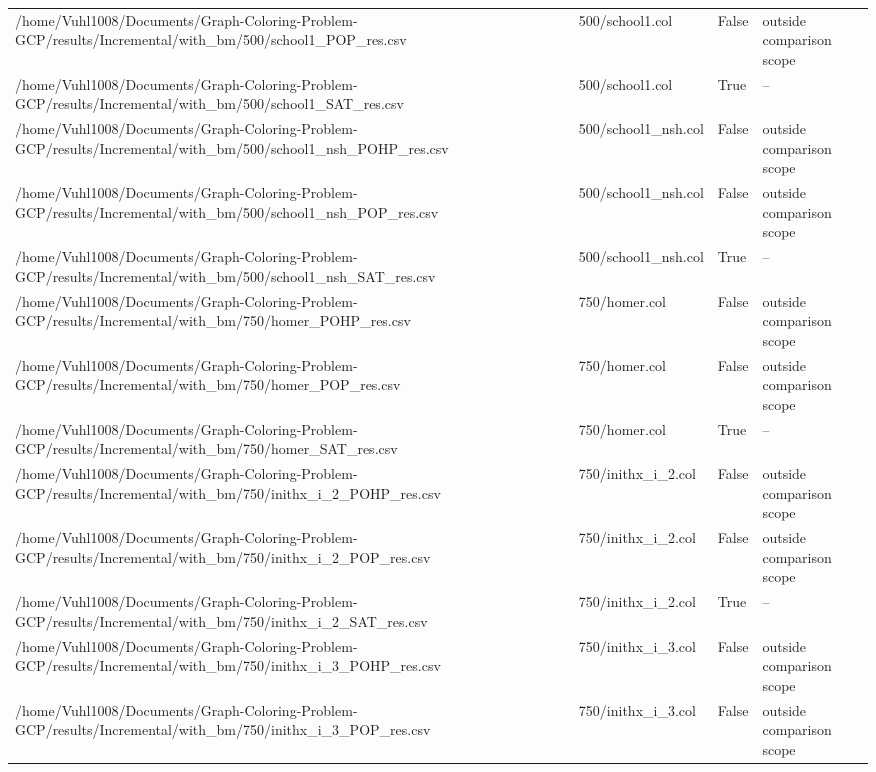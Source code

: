\begin{table}[htbp]
\begin{tabular}{llll}
/home/Vuhl1008/Documents/Graph-Coloring-Problem-GCP/results/Incremental/with\_bm/500/school1\_POP\_res.csv & 500/school1.col & False & outside comparison scope \\
/home/Vuhl1008/Documents/Graph-Coloring-Problem-GCP/results/Incremental/with\_bm/500/school1\_SAT\_res.csv & 500/school1.col & True & -- \\
/home/Vuhl1008/Documents/Graph-Coloring-Problem-GCP/results/Incremental/with\_bm/500/school1\_nsh\_POHP\_res.csv & 500/school1\_nsh.col & False & outside comparison scope \\
/home/Vuhl1008/Documents/Graph-Coloring-Problem-GCP/results/Incremental/with\_bm/500/school1\_nsh\_POP\_res.csv & 500/school1\_nsh.col & False & outside comparison scope \\
/home/Vuhl1008/Documents/Graph-Coloring-Problem-GCP/results/Incremental/with\_bm/500/school1\_nsh\_SAT\_res.csv & 500/school1\_nsh.col & True & -- \\
/home/Vuhl1008/Documents/Graph-Coloring-Problem-GCP/results/Incremental/with\_bm/750/homer\_POHP\_res.csv & 750/homer.col & False & outside comparison scope \\
/home/Vuhl1008/Documents/Graph-Coloring-Problem-GCP/results/Incremental/with\_bm/750/homer\_POP\_res.csv & 750/homer.col & False & outside comparison scope \\
/home/Vuhl1008/Documents/Graph-Coloring-Problem-GCP/results/Incremental/with\_bm/750/homer\_SAT\_res.csv & 750/homer.col & True & -- \\
/home/Vuhl1008/Documents/Graph-Coloring-Problem-GCP/results/Incremental/with\_bm/750/inithx\_i\_2\_POHP\_res.csv & 750/inithx\_i\_2.col & False & outside comparison scope \\
/home/Vuhl1008/Documents/Graph-Coloring-Problem-GCP/results/Incremental/with\_bm/750/inithx\_i\_2\_POP\_res.csv & 750/inithx\_i\_2.col & False & outside comparison scope \\
/home/Vuhl1008/Documents/Graph-Coloring-Problem-GCP/results/Incremental/with\_bm/750/inithx\_i\_2\_SAT\_res.csv & 750/inithx\_i\_2.col & True & -- \\
/home/Vuhl1008/Documents/Graph-Coloring-Problem-GCP/results/Incremental/with\_bm/750/inithx\_i\_3\_POHP\_res.csv & 750/inithx\_i\_3.col & False & outside comparison scope \\
/home/Vuhl1008/Documents/Graph-Coloring-Problem-GCP/results/Incremental/with\_bm/750/inithx\_i\_3\_POP\_res.csv & 750/inithx\_i\_3.col & False & outside comparison scope \\

\end{tabular}
\end{table}
